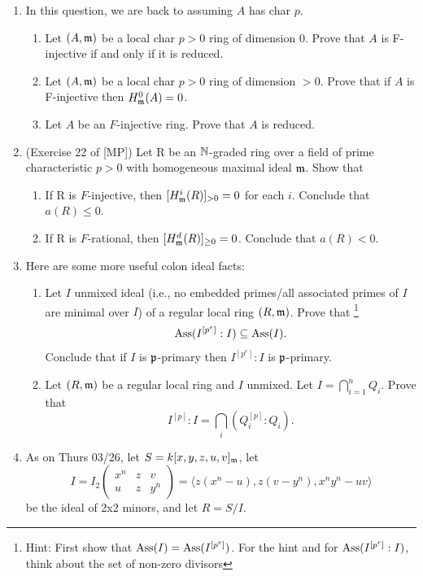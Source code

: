 \documentclass[11pt]{amsart}
\theoremstyle{definition}
\begin{document}
\begin{enumerate}[itemsep=4em]
\item In this question, we are back to assuming $A$ has char $p$.
\begin{enumerate}
\item Let $(A,\mathfrak{m})$ be a local char $p>0$ ring of dimension 0. Prove that $A$ is F-injective if and only if it is reduced.


\item Let $(A,\mathfrak{m})$ be a local char $p>0$ ring of dimension $>0$. Prove that if $A$ is F-injective then $H^0_{\mathfrak{m}}(A)=0$.

\item Let $A$ be an $F$-injective ring. Prove that $A$ is reduced.

\end{enumerate}

\item (Exercise 22 of [MP]) Let R be an $\mathbb{N}$-graded ring over a field of prime characteristic $p > 0$ with
homogeneous maximal ideal $\mathfrak{m}$. Show that
\begin{enumerate}
\item If R is $F$-injective, then $[H^i_{\mathfrak{m}}(R)]_{>0} = 0$ for each $i$. Conclude that $a(R)\le 0$.


\item If R is $F$-rational, then $[H^d_{\mathfrak{m}}(R)]_{\ge 0} = 0$. Conclude that $a(R)<0$.

\end{enumerate}

\newpage

\item Here are some more useful colon ideal facts:
\begin{enumerate}
\item
Let $I$ unmixed ideal (i.e., no embedded primes/all associated primes of $I$ are minimal over $I$) of a regular local ring $(R,\mathfrak{m})$. Prove that
\footnote{Hint: First show that $\operatorname{Ass}(I)=\operatorname{Ass}(I^{[p^e]})$. For the hint and for $\operatorname{Ass}(I^{[p^e]}:I)$, think about the set of non-zero divisors}
\[
\operatorname{Ass}(I^{[p^e]}:I) \subseteq \operatorname{Ass}(I).
\]
Conclude that if $I$ is $\mathfrak{p}$-primary then $I^{[p^e]}:I$ is $\mathfrak{p}$-primary.

\item 
Let $(R,\mathfrak{m})$ be a regular local ring and $I$ unmixed. Let $I=\bigcap_{i=1}^n Q_i$. Prove that 
\[
I^{[p]}:I = \bigcap_{i} (Q_i^{[p]}:Q_i).
\]


\end{enumerate}

\item As on Thurs 03/26, let $S=k[x,y,z,u,v]_{\mathfrak{m}}$, let 
\[
I = I_2\begin{pmatrix}
x^n & z & v \\
u   & z & y^n
\end{pmatrix}
= \langle z(x^n-u), z(v-y^n), x^ny^n-uv\rangle
\]
be the ideal of 2x2 minors, and let $R=S/I$. 


\end{enumerate}
\end{document}
